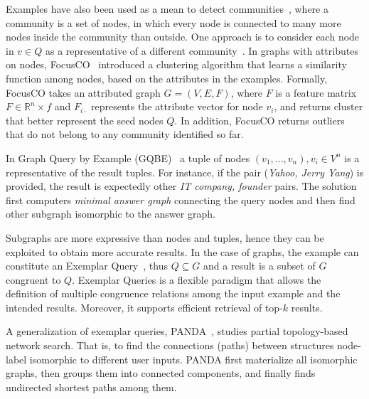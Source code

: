 Examples have also been used as a mean to detect communities~\citep{staudt2014detecting,perozzi2014focused}, where a community is a set of nodes, in which every node is connected to many more nodes inside the community than outside. 
One approach is to consider each node in $v \in Q$ as a representative of a different community~\citep{staudt2014detecting}. 
In graphs with attributes on nodes, FocusCO~\citep{perozzi2014focused} introduced a clustering algorithm that learns a similarity function among nodes, based on the attributes in the examples.
Formally, FocusCO takes an attributed graph $G = (V,E,F)$, where $F$ is a feature matrix $F \in \mathbb{R}^n\times f$ and $F_{i\cdot}$ represents the attribute vector for node $v_i$, and returns cluster that better represent the seed nodes $Q$.
In addition, FocusCO returns outliers that do not belong to any community identified so far.  



In Graph Query by Example (GQBE)~\citep{jayaram2015querying} a tuple of nodes $(v_1, ..., v_n), v_i \in V^n$ is a representative of the result tuples. 
For instance, if the pair (\emph{Yahoo, Jerry Yang}) is provided, the result is expectedly other \emph{IT company, founder} pairs. 
The solution first computers \emph{minimal answer graph} connecting the query nodes and then find other subgraph isomorphic to the answer graph. 

Subgraphs are more expressive than nodes and tuples, hence they can be exploited to obtain more accurate results. 
In the case of graphs, the example can constitute an Exemplar Query~\citep{mottin2016exemplar}, thus $Q\subseteq G$ and a result is a subset of $G$ congruent to $Q$.
Exemplar Queries is a flexible paradigm that allows the definition of multiple congruence relations among the input example and the intended results. 
Moreover, it supports efficient retrieval of top-$k$ results. 

A generalization of exemplar queries, PANDA~\citep{xie2017panda}, studies partial topology-based network search. 
That is, to find the connections (paths) between structures node-label isomorphic to different user inputs. 
PANDA first materialize all isomorphic graphs, then groups them into connected components, and finally finds undirected shortest paths among them. 


